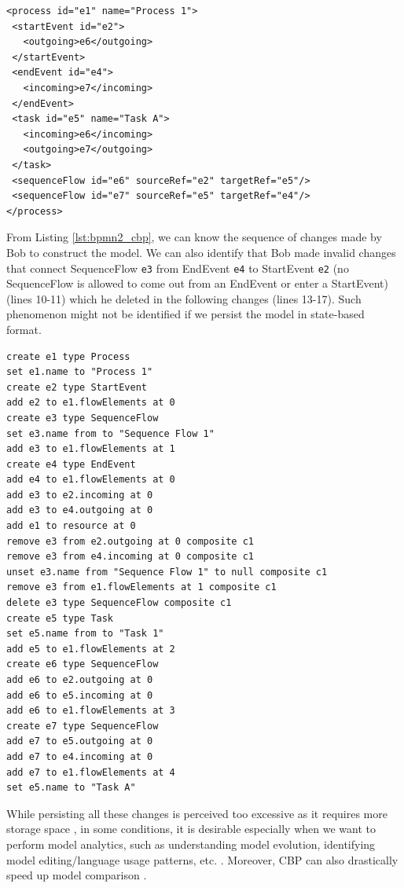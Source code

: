 \documentclass[conference]{IEEEtran}
\begin{document}
\vspace{-15pt}
\begin{lstlisting}[style=eol,numbersep=1pt,caption={A BPMN2 model in Figure \ref{fig:bpmn2} persisted in simplified XMI.},label=lst:bpmn2_xmi]
<process id="e1" name="Process 1">
 <startEvent id="e2">
   <outgoing>e6</outgoing>
 </startEvent>
 <endEvent id="e4">
   <incoming>e7</incoming>
 </endEvent>
 <task id="e5" name="Task A">
   <incoming>e6</incoming>
   <outgoing>e7</outgoing>
 </task>
 <sequenceFlow id="e6" sourceRef="e2" targetRef="e5"/>
 <sequenceFlow id="e7" sourceRef="e5" targetRef="e4"/>
</process>
\end{lstlisting}

From Listing \ref{lst:bpmn2_cbp}, we can know the sequence of changes made by Bob to construct the model. We can also identify that Bob made invalid changes 
that connect SequenceFlow \texttt{e3} from EndEvent \texttt{e4} to StartEvent \texttt{e2} 
(no SequenceFlow is allowed to come out from an EndEvent or enter a StartEvent) (lines 10-11) 
which he deleted in the following changes (lines 13-17). 
Such phenomenon might not be identified if we persist the model in state-based format. 

\vspace{-15pt}
\begin{lstlisting}[style=eol,numbersep=5pt,caption={The pseudo-formatted CBP of the model in Figure \ref{fig:bpmn2}.},label=lst:bpmn2_cbp]
create e1 type Process
set e1.name to "Process 1"
create e2 type StartEvent
add e2 to e1.flowElements at 0
create e3 type SequenceFlow
set e3.name from to "Sequence Flow 1"
add e3 to e1.flowElements at 1
create e4 type EndEvent
add e4 to e1.flowElements at 0
add e3 to e2.incoming at 0
add e3 to e4.outgoing at 0
add e1 to resource at 0
remove e3 from e2.outgoing at 0 composite c1
remove e3 from e4.incoming at 0 composite c1
unset e3.name from "Sequence Flow 1" to null composite c1
remove e3 from e1.flowElements at 1 composite c1
delete e3 type SequenceFlow composite c1
create e5 type Task
set e5.name from to "Task 1"
add e5 to e1.flowElements at 2
create e6 type SequenceFlow
add e6 to e2.outgoing at 0
add e6 to e5.incoming at 0
add e6 to e1.flowElements at 3
create e7 type SequenceFlow
add e7 to e5.outgoing at 0
add e7 to e4.incoming at 0
add e7 to e1.flowElements at 4
set e5.name to "Task A"
\end{lstlisting}

While persisting all these changes is perceived too excessive as it requires more storage space \cite{DBLP:conf/models/YohannisRPK18}, 
in some conditions, it is desirable especially when we want to perform model analytics, 
such as understanding model evolution, identifying model editing/language usage patterns, etc. \cite{DBLP:conf/models/YohannisKP17}. 
Moreover, CBP can also drastically speed up model comparison \cite{yohannis2018efficient}.
\end{document}
